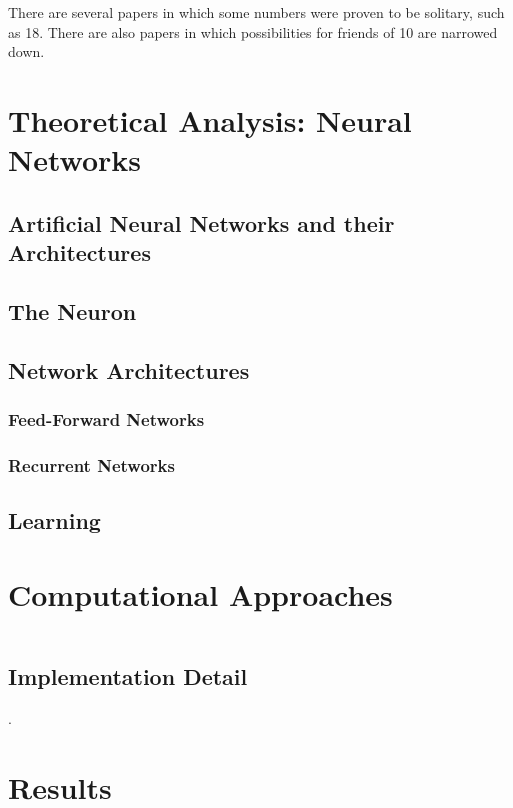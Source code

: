 \documentclass[11pt]{article}
\theoremstyle{definition}
\begin{document}
There are several papers in which some numbers were proven to be solitary, such as 18. There are also papers in which possibilities for friends of 10 are narrowed down.
$ $ \indent 

\section{Theoretical Analysis: Neural Networks}
\subsection{Artificial Neural Networks and their Architectures}

\subsection{The Neuron}


\subsection{Network Architectures}

\subsubsection{Feed-Forward Networks}

\subsubsection{Recurrent Networks}

\subsection{Learning}
 




\section{Computational Approaches}$ $
\subsection{Implementation Detail}
.

\section{Results}$ $
\end{document}
